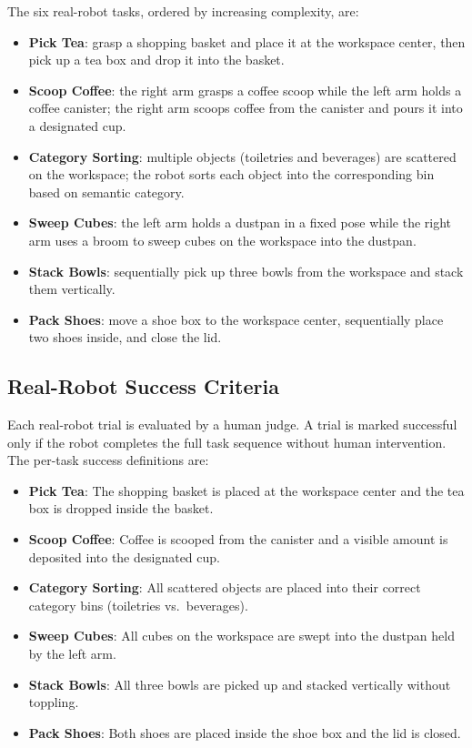 The six real-robot tasks, ordered by increasing complexity, are:

\begin{itemize}
    \item \textbf{Pick Tea}: grasp a shopping basket and place it at the workspace center, then pick up a tea box and drop it into the basket.
    \item \textbf{Scoop Coffee}: the right arm grasps a coffee scoop while the left arm holds a coffee canister; the right arm scoops coffee from the canister and pours it into a designated cup.
    \item \textbf{Category Sorting}: multiple objects (toiletries and beverages) are scattered on the workspace; the robot sorts each object into the corresponding bin based on semantic category.
    \item \textbf{Sweep Cubes}: the left arm holds a dustpan in a fixed pose while the right arm uses a broom to sweep cubes on the workspace into the dustpan.
    \item \textbf{Stack Bowls}: sequentially pick up three bowls from the workspace and stack them vertically.
    \item \textbf{Pack Shoes}: move a shoe box to the workspace center, sequentially place two shoes inside, and close the lid.
\end{itemize}

\subsection{Real-Robot Success Criteria}
\label{app:real-robot-success-criteria}

Each real-robot trial is evaluated by a human judge. A trial is marked successful only if the robot completes the full task sequence without human intervention. The per-task success definitions are:

\begin{itemize}
    \item \textbf{Pick Tea}: The shopping basket is placed at the workspace center and the tea box is dropped inside the basket.
    \item \textbf{Scoop Coffee}: Coffee is scooped from the canister and a visible amount is deposited into the designated cup.
    \item \textbf{Category Sorting}: All scattered objects are placed into their correct category bins (toiletries vs.\ beverages).
    \item \textbf{Sweep Cubes}: All cubes on the workspace are swept into the dustpan held by the left arm.
    \item \textbf{Stack Bowls}: All three bowls are picked up and stacked vertically without toppling.
    \item \textbf{Pack Shoes}: Both shoes are placed inside the shoe box and the lid is closed.
\end{itemize}

